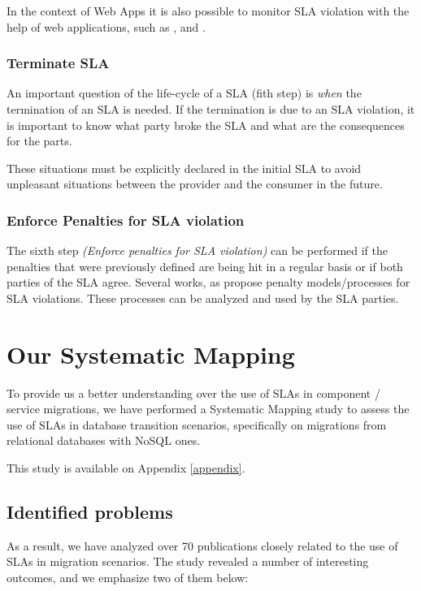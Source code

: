 In the context of Web Apps it is also possible to monitor SLA violation with the help of web applications, such as \cite{datadog}, \cite{appsee} and \cite{newrelic}.

\subsubsection{Terminate SLA}
An important question of the life-cycle of a SLA (fith step) is \textit{when} the termination of an SLA is needed. If the termination is due to an SLA violation, it is important to know what party broke the SLA and what are the consequences for the parts.

These situations must be explicitly declared in the initial SLA to avoid unpleasant situations between the provider and the consumer in the future.

\subsubsection{Enforce Penalties for SLA violation}
The sixth step \textit{(Enforce penalties for SLA violation)} can be performed if the penalties that were previously defined are being hit in a regular basis or if both parties of the SLA agree. Several works, as \cite{Lee:2010:PSR:1844765.1845204} propose penalty models/processes for SLA violations. These processes can be analyzed and used by the SLA parties. 

\section{Our Systematic Mapping}\label{oursystematicmapping}

To provide us a better understanding over the use of SLAs in component / service migrations, we have performed a Systematic Mapping study to assess the use of SLAs in database transition scenarios, specifically on migrations from relational databases with NoSQL ones. 

This study is available on Appendix \ref{appendix}. 

\subsection{Identified problems}

As a result, we have analyzed over 70 publications closely related to the use of SLAs in migration scenarios. The study revealed a number of interesting outcomes, and we emphasize two of them below:

